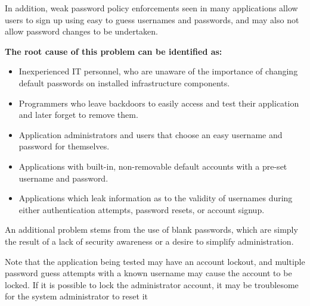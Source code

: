 	In addition, weak password policy enforcements seen in many applications allow users to sign up 
	using easy to guess usernames and passwords, and may also not allow password changes to be 
	undertaken.

	{\bf The root cause of this problem can be identified as:}
		\begin{itemize}
			\item Inexperienced IT personnel, who are unaware of the importance of changing default 
			passwords on installed infrastructure components.
			\item Programmers who leave backdoors to easily access and test their application and 
			later forget to remove them.
			\item Application administrators and users that choose an easy username and password 
			for themselves.
			\item Applications with built-in, non-removable default accounts with a pre-set username 
			and password.
			\item Applications which leak information as to the validity of usernames during either
			authentication attempts, password resets, or account signup.
		\end{itemize}
	
	An additional problem stems from the use of blank passwords, which are simply the result of a lack 
	of security awareness or a desire to simplify administration.

	Note that the application being tested may have an account lockout, and multiple password guess 
	attempts with a known username may cause the account to be locked. If it is possible to lock the
	administrator account, it may be troublesome for the system administrator to reset it

